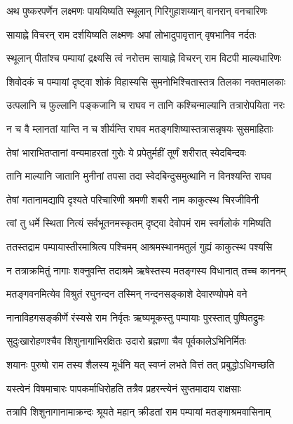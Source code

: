 \twolineshloka
{अथ पुष्करपर्णेन लक्ष्मणः पाययिष्यति}
{स्थूलान् गिरिगुहाशय्यान् वानरान् वनचारिणः} %

\twolineshloka
{सायाह्ने विचरन् राम दर्शयिष्यति लक्ष्मणः}
{अपां लोभादुपावृत्तान् वृषभानिव नर्दतः} %

\twolineshloka
{स्थूलान् पीतांश्च पम्पायां द्रक्ष्यसि त्वं नरोत्तम}
{सायाह्ने विचरन् राम विटपी माल्यधारिणः} %

\twolineshloka
{शिवोदकं च पम्पायां दृष्ट्वा शोकं विहास्यसि}
{सुमनोभिश्चितास्तत्र तिलका नक्तमालकाः} %

\twolineshloka
{उत्पलानि च फुल्लानि पङ्कजानि च राघव}
{न तानि कश्चिन्माल्यानि तत्रारोपयिता नरः} %

\twolineshloka
{न च वै म्लानतां यान्ति न च शीर्यन्ति राघव}
{मतङ्गशिष्यास्तत्रासन्नृषयः सुसमाहिताः} %

\twolineshloka
{तेषां भाराभितप्तानां वन्यमाहरतां गुरोः}
{ये प्रपेतुर्महीं तूर्णं शरीरात् स्वेदबिन्दवः} %

\twolineshloka
{तानि माल्यानि जातानि मुनीनां तपसा तदा}
{स्वेदबिन्दुसमुत्थानि न विनश्यन्ति राघव} %

\twolineshloka
{तेषां गतानामद्यापि दृश्यते परिचारिणी}
{श्रमणी शबरी नाम काकुत्स्थ चिरजीविनी} %

\twolineshloka
{त्वां तु धर्मे स्थिता नित्यं सर्वभूतनमस्कृतम्}
{दृष्ट्वा देवोपमं राम स्वर्गलोकं गमिष्यति} %

\twolineshloka
{ततस्तद्राम पम्पायास्तीरमाश्रित्य पश्चिमम्}
{आश्रमस्थानमतुलं गुह्यं काकुत्स्थ पश्यसि} %

\twolineshloka
{न तत्राक्रमितुं नागाः शक्नुवन्ति तदाश्रमे}
{ऋषेस्तस्य मतङ्गस्य विधानात् तच्च काननम्} %

\twolineshloka
{मतङ्गवनमित्येव विश्रुतं रघुनन्दन}
{तस्मिन् नन्दनसङ्काशे देवारण्योपमे वने} %

\twolineshloka
{नानाविहगसङ्कीर्णे रंस्यसे राम निर्वृतः}
{ऋष्यमूकस्तु पम्पायाः पुरस्तात् पुष्पितद्रुमः} %

\twolineshloka
{सुदुःखारोहणश्चैव शिशुनागाभिरक्षितः}
{उदारो ब्रह्मणा चैव पूर्वकालेऽभिनिर्मितः} %

\twolineshloka
{शयानः पुरुषो राम तस्य शैलस्य मूर्धनि}
{यत् स्वप्नं लभते वित्तं तत् प्रबुद्धोऽधिगच्छति} %

\twolineshloka
{यस्त्वेनं विषमाचारः पापकर्माधिरोहति}
{तत्रैव प्रहरन्त्येनं सुप्तमादाय राक्षसाः} %

\twolineshloka
{तत्रापि शिशुनागानामाक्रन्दः श्रूयते महान्}
{क्रीडतां राम पम्पायां मतङ्गाश्रमवासिनाम्} %

